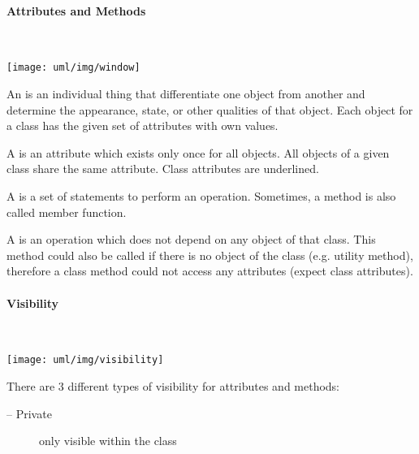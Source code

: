 \begin{minipage}[c]{0.45\linewidth}
\paragraph{Attributes and Methods}\mbox{} \\
\begin{minipage}{0.3\linewidth}
\texttt{[image: uml/img/window]}
\end{minipage}
\hfill
\begin{minipage}{0.65\linewidth}

An  is an individual thing that differentiate one object from
another and determine the appearance, state, or other qualities of that object.
Each object for a class has the given set of attributes with
own values.

A  is an attribute which exists only once
for all objects. All objects of a given class share the same attribute.
Class attributes are underlined.

A  is a set of statements to perform an operation.
Sometimes, a method is also called member function.

A  is an operation which does not depend on any object
of that class. This method could also be called if there is no object of the
class (e.g. utility method), therefore a class method could not access any
attributes (expect class attributes).
\end{minipage}

\ifslides
\newpage
\fi
%
\paragraph{Visibility}\mbox{} \\
\begin{minipage}[c]{0.4\linewidth}
\texttt{[image: uml/img/visibility]}
\end{minipage}
\begin{minipage}[c]{0.58\linewidth}
There are 3 different types of visibility for attributes and methods:

\begin{description}
\item [-- Private] only visible within the class


\end{description}
\end{minipage}
\end{minipage}
